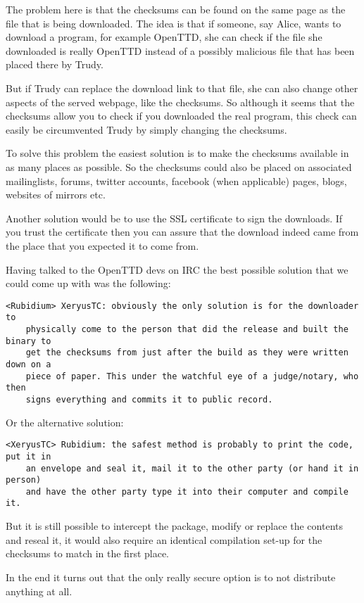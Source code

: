 The problem here is that the checksums can be found on the same page as the file that is being downloaded. The idea is that if someone, say Alice, wants to  download a program, for example OpenTTD, she can check if the file she downloaded is really OpenTTD instead of a possibly malicious file that has been placed there by Trudy.

But if Trudy can replace the download link to that file, she can also change other aspects of the served webpage, like the checksums. So although it seems that the checksums allow you to check if you downloaded the real program, this check can easily be circumvented Trudy by simply changing the checksums.

To solve this problem the easiest solution is to make the checksums available in as many places as possible. So the checksums could also be placed on associated mailinglists, forums, twitter accounts, facebook (when applicable) pages, blogs, websites of mirrors etc.

Another solution would be to use the SSL certificate to sign the downloads. If you trust the certificate then you can assure that the download indeed came from the place that you expected it to come from.

Having talked to the OpenTTD devs on IRC the best possible solution that we could come up with was the following:
\begin{verbatim}
<Rubidium> XeryusTC: obviously the only solution is for the downloader to
    physically come to the person that did the release and built the binary to
    get the checksums from just after the build as they were written down on a
    piece of paper. This under the watchful eye of a judge/notary, who then
    signs everything and commits it to public record.
\end{verbatim}
Or the alternative solution:
\begin{verbatim}
<XeryusTC> Rubidium: the safest method is probably to print the code, put it in
    an envelope and seal it, mail it to the other party (or hand it in person)
    and have the other party type it into their computer and compile it.
\end{verbatim}
But it is still possible to intercept the package, modify or replace the contents and reseal it, it would also require an identical compilation set-up for the checksums to match in the first place.

In the end it turns out that the only really secure option is to not distribute anything at all.